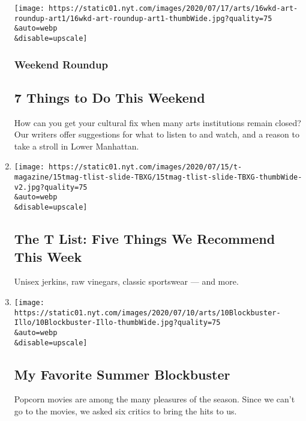 \begin{enumerate}
  \texttt{[image: https://static01.nyt.com/images/2020/07/17/arts/16wkd-art-roundup-art1/16wkd-art-roundup-art1-thumbWide.jpg?quality=75\\\&auto=webp\\\&disable=upscale]}

  \hypertarget{weekend-roundup}{%
  \subsubsection{Weekend Roundup}\label{weekend-roundup}}

  \hypertarget{7-things-to-do-this-weekend}{%
  \subsection{7 Things to Do This
  Weekend}\label{7-things-to-do-this-weekend}}

  How can you get your cultural fix when many arts institutions remain
  closed? Our writers offer suggestions for what to listen to and watch,
  and a reason to take a stroll in Lower Manhattan.
\item
  \href{/2020/07/16/t-magazine/margo-price-album-tlist.html}{}

  \texttt{[image: https://static01.nyt.com/images/2020/07/15/t-magazine/15tmag-tlist-slide-TBXG/15tmag-tlist-slide-TBXG-thumbWide-v2.jpg?quality=75\\\&auto=webp\\\&disable=upscale]}

  \hypertarget{the-t-list-five-things-we-recommend-this-week-2}{%
  \subsection{The T List: Five Things We Recommend This
  Week}\label{the-t-list-five-things-we-recommend-this-week-2}}

  Unisex jerkins, raw vinegars, classic sportswear --- and more.
\item
  \href{/2020/07/09/movies/summer-movies-blockbusters.html}{}

  \texttt{[image: https://static01.nyt.com/images/2020/07/10/arts/10Blockbuster-Illo/10Blockbuster-Illo-thumbWide.jpg?quality=75\\\&auto=webp\\\&disable=upscale]}

  \hypertarget{my-favorite-summer-blockbuster}{%
  \subsection{My Favorite Summer
  Blockbuster}\label{my-favorite-summer-blockbuster}}

  Popcorn movies are among the many pleasures of the season. Since we
  can't go to the movies, we asked six critics to bring the hits to us.


\end{enumerate}
